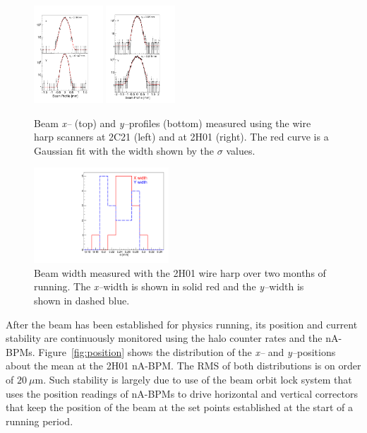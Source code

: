 \begin{figure}[ht]
\begin{center}
\includegraphics[width=0.23\textwidth]{2C21_fits.pdf}
\includegraphics[width=0.23\textwidth]{2H01_fits.pdf}
	\caption{Beam {\it x--} (top) and {\it y--}profiles (bottom) measured using the wire harp scanners at 2C21 (left) and at 2H01 (right). The red
	curve is a Gaussian fit with the width shown by the $\sigma$ values. }
\label{fig:profile}
\end{center}
\end{figure}

\begin{figure}[ht]
\begin{center}
\includegraphics[width=0.45\textwidth]{BeamWidth.pdf}
	\caption{Beam width measured with the 2H01 wire harp over two months of running. The {\it x--}width is shown in solid red and the 
	{\it y--}width is shown in dashed blue.}
\label{fig:prof2h01}
\end{center}
\end{figure}

After the beam has been established for physics running, its position and current stability are continuously monitored using the halo 
counter rates and the nA-BPMs. Figure~\ref{fig:position} shows the distribution of the {\it x--} and {\it y--}positions about the mean at the 
2H01 nA-BPM. The RMS of both distributions is on order of $20~\mu$m. Such stability is largely due to use of the beam orbit lock system 
that uses the position readings of nA-BPMs to drive horizontal and vertical correctors that keep the position of the beam at the set points 
established at the start of a running period.

